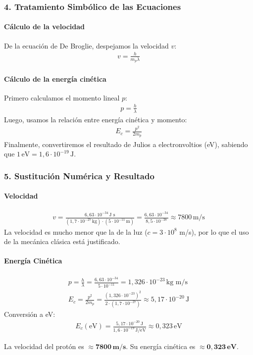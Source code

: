 \subsubsection*{4. Tratamiento Simbólico de las Ecuaciones}
\paragraph*{Cálculo de la velocidad}
De la ecuación de De Broglie, despejamos la velocidad $v$:
\begin{gather}
    v = \frac{h}{m_p \lambda}
\end{gather}

\paragraph*{Cálculo de la energía cinética}
Primero calculamos el momento lineal $p$:
\begin{gather}
    p = \frac{h}{\lambda}
\end{gather}
Luego, usamos la relación entre energía cinética y momento:
\begin{gather}
    E_c = \frac{p^2}{2m_p}
\end{gather}
Finalmente, convertiremos el resultado de Julios a electronvoltios (eV), sabiendo que $1\,\text{eV} = 1,6\cdot10^{-19}\,\text{J}$.

\subsubsection*{5. Sustitución Numérica y Resultado}
\paragraph*{Velocidad}
\begin{gather}
    v = \frac{6,63\cdot10^{-34}\,\text{J s}}{(1,7\cdot10^{-27}\,\text{kg}) \cdot (5\cdot10^{-11}\,\text{m})} = \frac{6,63\cdot10^{-34}}{8,5\cdot10^{-38}} \approx 7800\,\text{m/s}
\end{gather}
La velocidad es mucho menor que la de la luz ($c=3\cdot10^8$ m/s), por lo que el uso de la mecánica clásica está justificado.

\paragraph*{Energía Cinética}
\begin{gather}
    p = \frac{h}{\lambda} = \frac{6,63\cdot10^{-34}}{5\cdot10^{-11}} = 1,326\cdot10^{-23}\,\text{kg m/s} \\
    E_c = \frac{p^2}{2m_p} = \frac{(1,326\cdot10^{-23})^2}{2 \cdot (1,7\cdot10^{-27})} \approx 5,17\cdot10^{-20}\,\text{J}
\end{gather}
Conversión a eV:
\begin{gather}
    E_c (\text{eV}) = \frac{5,17\cdot10^{-20}\,\text{J}}{1,6\cdot10^{-19}\,\text{J/eV}} \approx 0,323\,\text{eV}
\end{gather}
\begin{cajaresultado}
La velocidad del protón es $\boldsymbol{\approx 7800\,\textbf{m/s}}$. Su energía cinética es $\boldsymbol{\approx 0,323\,\textbf{eV}}$.
\end{cajaresultado}


